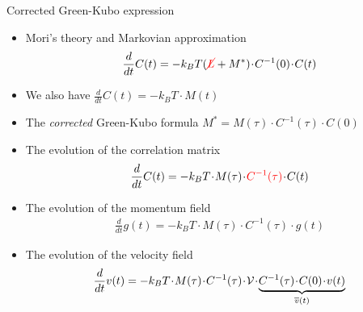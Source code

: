 \documentclass{beamer}
\newcommand{\esc}{\!\cdot\!}
\begin{document}
\begin{frame}{Corrected Green-Kubo expression}
  \begin{itemize}
    \item Mori's theory and Markovian approximation 
      \begin{align}
        \frac{d}{dt}C(t)=-k_BT({\color{red}\cancel{L}} + M^*)\esc C^{-1}(0)\esc C(t)
        \nonumber
      \end{align}
    \item We also have $\frac{d}{dt}C(t)=-k_B T\esc M(t)$
    \item The \textit{corrected} Green-Kubo formula 
       $ M^*=M(\tau)\esc C^{-1}(\tau)\esc C(0)$
    \item The evolution of the correlation matrix
      \begin{align}
        \frac{d}{dt}C(t)=-k_BT\esc M(\tau)\esc {\color{red} C^{-1}(\tau)}\esc C(t)
        \nonumber
      \end{align}
    \item The evolution of the momentum field
      \begin{align}
        \frac{d}{dt}g(t)=-k_BT\esc M(\tau)\esc C^{-1}(\tau)\esc g(t)
        \nonumber
      \end{align}
    \item The evolution of the velocity field
      \begin{align}
        \frac{d}{dt}v(t)=-k_BT\esc M(\tau)\esc C^{-1}(\tau)\esc {\cal V}\esc \underbrace{C^{-1}(\tau)\esc C(0)\esc v(t)}_{\overline{v}(t)}
        \nonumber
      \end{align}
  \end{itemize}
\end{frame}
\end{document}
